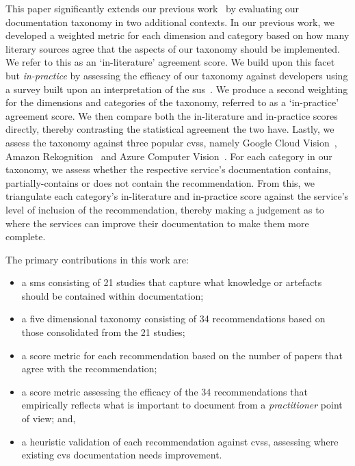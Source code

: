 This paper significantly extends our previous work~\citep{Cummaudo:2019esem} by evaluating our  documentation taxonomy in two additional contexts. In our previous work, we developed a weighted metric for each dimension and category based on how many literary sources agree that the aspects of our taxonomy should be implemented. We refer to this as an `in-literature' agreement score. We build upon this facet but \textit{in-practice} by assessing the efficacy of our taxonomy against developers using a survey built upon an interpretation of the \gls{sus}~\citep{Brooke:1996ua}. We produce a second weighting for the dimensions and categories of the taxonomy, referred to as a `in-practice' agreement score. We then compare both the in-literature and in-practice scores directly, thereby contrasting the statistical agreement the two have. Lastly, we assess the taxonomy against three popular \glspl{cvs}, namely Google Cloud Vision~, Amazon Rekognition~ and Azure Computer Vision~. For each category in our taxonomy, we assess whether the respective service's documentation contains, partially-contains or does not contain the recommendation. From this, we triangulate each category's in-literature and in-practice score against the service's level of inclusion of the recommendation, thereby making a judgement as to where the services can improve their documentation to make them more complete.

The primary contributions in this work are:

\begin{itemize}
  \item a \gls{sms} consisting of 21 studies that capture what knowledge or artefacts should be contained within  documentation;
  \item a five dimensional taxonomy consisting of 34 recommendations based on those consolidated from the 21 studies;
  \item a score metric for each recommendation based on the number of papers that agree with the recommendation;
  \item a score metric assessing the efficacy of the 34 recommendations that empirically reflects what is important to document from a \textit{practitioner} point of view; and,
  \item a heuristic validation of each recommendation against \glspl{cvs}, assessing where existing \gls{cvs}  documentation needs improvement.
\end{itemize}

